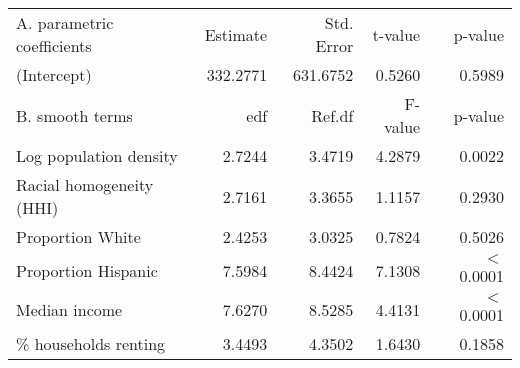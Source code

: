 \begin{table}[ht]
\centering
\begin{tabular}{lrrrr}
   \hline
A. parametric coefficients & Estimate & Std. Error & t-value & p-value \\ 
  (Intercept) & 332.2771 & 631.6752 & 0.5260 & 0.5989 \\ 
   \hline
B. smooth terms & edf & Ref.df & F-value & p-value \\ 
  Log population density & 2.7244 & 3.4719 & 4.2879 & 0.0022 \\ 
  Racial homogeneity (HHI) & 2.7161 & 3.3655 & 1.1157 & 0.2930 \\ 
  Proportion White & 2.4253 & 3.0325 & 0.7824 & 0.5026 \\ 
  Proportion Hispanic & 7.5984 & 8.4424 & 7.1308 & $<$ 0.0001 \\ 
  Median income & 7.6270 & 8.5285 & 4.4131 & $<$ 0.0001 \\ 
  \% households renting & 3.4493 & 4.3502 & 1.6430 & 0.1858 \\ 
   \hline
\end{tabular}
\caption{ } 
\label{Demographic GAM}
\end{table}
